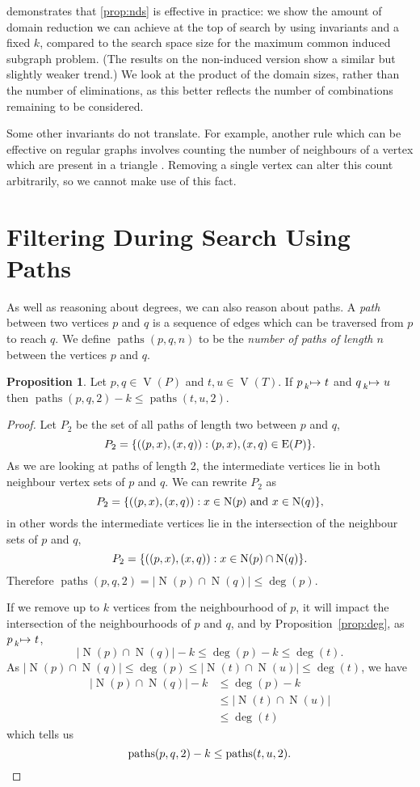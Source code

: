\documentclass[letterpaper]{article}
\newcommand{\citep}[1]{\cite{#1}}
\theoremstyle{definition}
\newtheorem{proposition}{Proposition}
\newcommand{\paths}{\operatorname{paths}}
\newcommand{\lessmap}[1]{\prescript{}{#1}{\mapsto}\ }
\newcommand{\V}{\operatorname{V}}
\newcommand{\EdgeSet}{\operatorname{E}}
\newcommand{\N}{\operatorname{N}}
\begin{document}
 demonstrates that \cref{prop:nds} is effective in practice: we show the amount of
domain reduction we can achieve at the top of search by using invariants and a fixed $k$, compared
to the search space size for the maximum common induced subgraph problem. (The results on the
non-induced version show a similar but slightly weaker trend.) We look at the product of the domain
sizes, rather than the number of eliminations, as this better reflects the number of combinations
remaining to be considered.

Some other invariants do not translate. For example, another rule which can be effective on regular
graphs involves counting the number of neighbours of a vertex which are present in a triangle
\citep{mckay2014practical}. Removing a single vertex can alter this count arbitrarily, so we cannot
make use of this fact.

\section{Filtering During Search Using Paths}\label{section:pathfiltering}

As well as reasoning about degrees, we can also reason about paths.  A \emph{path} between two
vertices $p$ and $q$ is a sequence of edges which can be traversed from $p$ to reach $q$. We define
$\paths(p,q,n)$ to be the \emph{number of paths of length $n$} between the vertices $p$ and $q$.

\begin{proposition}\label{prop:paths}
    Let $p,q \in \V(P)$ and $t,u\in \V(T)$. If $p \lessmap{k} t$ and $q \lessmap{k} u$ then
     $\paths(p, q, 2) - k \le \paths(t, u, 2)$.
\end{proposition}
\begin{proof}
Let $P_{2}$ be the set of all paths of length two between $p$ and $q$, \[P_{2} = \{((p,x),(x,q)) :
(p,x),(x,q)\in \EdgeSet(P) \}\textnormal{.}\] As we are looking at paths of length 2,
the intermediate vertices lie in both neighbour vertex sets of $p$ and $q$. We can rewrite
$P_{2}$ as \[P_{2} = \{((p,x),(x,q)) : x\in \N(p) \text{ and } x\in \N(q) \}\textnormal{,}\] in
other words the intermediate vertices lie in the intersection of the neighbour sets of $p$ and
$q$, \[ P_{2}=\{((p,x),(x,q)) : x\in \N(p)\cap \N(q) \} \textnormal{.}\] Therefore
$\paths(p,q,2) = \left| \N(p)\cap \N(q) \right|  \leq \deg(p)$.

If we remove up to $k$ vertices from the neighbourhood of $p$, it will impact the intersection of
    the neighbourhoods of $p$ and $q$, and by Proposition~\ref{prop:deg}, as $p\lessmap{k}t$,
\[
\left| \N(p)\cap \N(q)\right| - k \leq \deg(p) - k \leq \deg(t).
\]
As $\left|\N(p)\cap \N(q)\right|\leq \deg(p) \leq \left|\N(t)\cap \N(u)\right|\leq \deg(t)$, we have
\begin{align*}
\left|\N(p)\cap \N(q)\right| - k & \leq \deg(p) - k \\
 & \leq \left|\N(t)\cap \N(u)\right|\\
 & \leq \deg(t)
\end{align*}
which tells us
\[
\paths(p, q, 2) - k \leq \paths(t, u, 2). \qedhere
\]
\end{proof}
\end{document}

